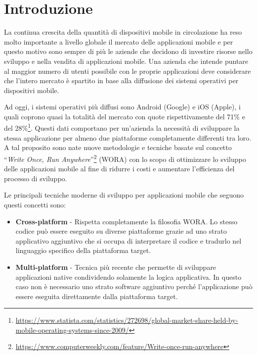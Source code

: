 
\section{Introduzione}
La continua crescita della quantità di dispositivi mobile in circolazione ha reso molto importante a livello globale il mercato delle applicazioni mobile e per questo motivo sono sempre di più le aziende che decidono di investire risorse nello sviluppo e nella vendita di applicazioni mobile. 
Una azienda che intende puntare al maggior numero di utenti possibile con le proprie applicazioni deve considerare che l'intero mercato è spartito in base alla diffusione dei sistemi operativi per dispositivi mobile. 

Ad oggi, 
i sistemi operativi più diffusi sono Android (Google) e iOS (Apple), 
i quali coprono quasi la totalità del mercato con quote rispettivamente del 71\% e del 28\%\footnote{\href{https://www.statista.com/statistics/272698/global-market-share-held-by-mobile-operating-systems-since-2009/}{https://www.statista.com/statistics/272698/global-market-share-held-by-mobile-operating-systems-since-2009/}}.
Questi dati comportano per un'azienda la necessità di sviluppare la stessa applicazione per almeno due piattaforme completamente differenti tra loro. 
A tal proposito sono nate nuove metodologie e tecniche basate sul concetto ``\textit{Write Once, Run Anywhere}''\footnote{\href{https://www.computerweekly.com/feature/Write-once-run-anywhere}{https://www.computerweekly.com/feature/Write-once-run-anywhere}} (WORA) con lo scopo di ottimizzare lo sviluppo delle applicazioni mobile al fine di ridurre i costi e aumentare l'efficienza del processo di sviluppo.

Le principali tecniche moderne di sviluppo per applicazioni mobile che seguono questi concetti sono:
\begin{itemize}
    \item \textbf{Cross-platform} - Rispetta completamente la filosofia WORA. Lo stesso codice può essere eseguito su diverse piattaforme grazie ad uno strato applicativo aggiuntivo che si occupa di interpretare il codice e tradurlo nel linguaggio specifico della piattaforma target.
    
    \item \textbf{Multi-platform} - Tecnica più recente che permette di sviluppare applicazioni native condividendo solamente la logica applicativa. In questo caso non è necessario uno strato software aggiuntivo perché l'applicazione può essere eseguita direttamente dalla piattaforma target.
\end{itemize}

